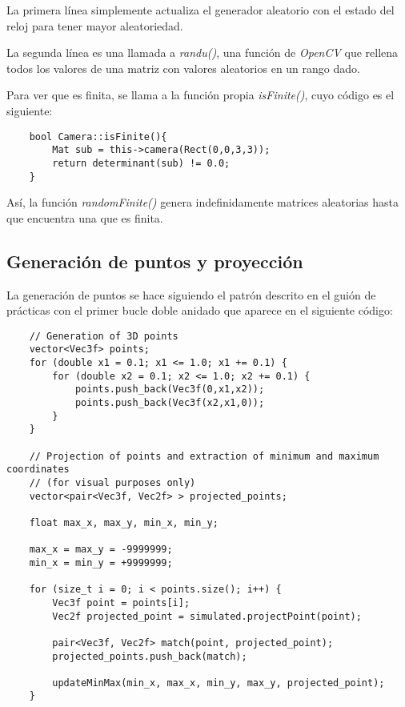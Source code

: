 \documentclass[a4paper, 11pt]{article}
\theoremstyle{definition}
\theoremstyle{theorem}
\begin{document}
    La primera línea simplemente actualiza el generador aleatorio con el estado del reloj para tener mayor aleatoriedad.

    La segunda línea es una llamada a \emph{randu()}, una función de \emph{OpenCV} que rellena todos los valores de una matriz con valores aleatorios en un rango dado.

    Para ver que es finita, se llama a la función propia \emph{isFinite()}, cuyo código es el siguiente:

    \begin{lstlisting}
    bool Camera::isFinite(){
        Mat sub = this->camera(Rect(0,0,3,3));
        return determinant(sub) != 0.0;
    }
    \end{lstlisting}

    Así, la función \emph{randomFinite()} genera indefinidamente matrices aleatorias hasta que encuentra una que es finita.

    \subsection{Generación de puntos y proyección}
    La generación de puntos se hace siguiendo el patrón descrito en el guión de prácticas con el primer bucle doble anidado que aparece en el siguiente código:

    \begin{lstlisting}
    // Generation of 3D points
    vector<Vec3f> points;
    for (double x1 = 0.1; x1 <= 1.0; x1 += 0.1) {
        for (double x2 = 0.1; x2 <= 1.0; x2 += 0.1) {
            points.push_back(Vec3f(0,x1,x2));
            points.push_back(Vec3f(x2,x1,0));
        }
    }

    // Projection of points and extraction of minimum and maximum coordinates
    // (for visual purposes only)
    vector<pair<Vec3f, Vec2f> > projected_points;

    float max_x, max_y, min_x, min_y;

    max_x = max_y = -9999999;
    min_x = min_y = +9999999;

    for (size_t i = 0; i < points.size(); i++) {
        Vec3f point = points[i];
        Vec2f projected_point = simulated.projectPoint(point);

        pair<Vec3f, Vec2f> match(point, projected_point);
        projected_points.push_back(match);

        updateMinMax(min_x, max_x, min_y, max_y, projected_point);
    }
    \end{lstlisting}
\end{document}
